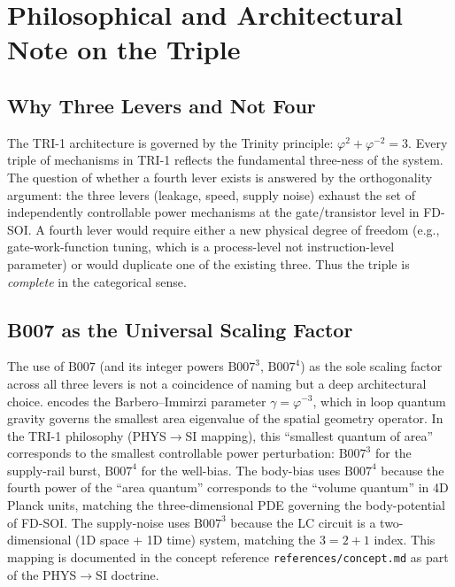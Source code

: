 \documentclass[12pt,a4paper]{report}
\theoremstyle{plain}
\theoremstyle{definition}
\theoremstyle{remark}
\newcommand{\Bseven}{\mathrm{B007}}
\begin{document}
\section{Philosophical and Architectural Note on the Triple}
\label{sec:philosophical}

\subsection{Why Three Levers and Not Four}
\label{ssec:why-three}

The TRI-1 architecture is governed by the Trinity principle:
$\varphi^{2} + \varphi^{-2} = 3$.
Every triple of mechanisms in TRI-1 reflects the fundamental three-ness
of the system.
The question of whether a fourth lever exists is answered by the
orthogonality argument: the three levers (leakage, speed, supply noise)
exhaust the set of independently controllable power mechanisms at the
gate/transistor level in FD-SOI.
A fourth lever would require either a new physical degree of freedom
(e.g., gate-work-function tuning, which is a process-level not
instruction-level parameter) or would duplicate one of the existing three.
Thus the triple is \emph{complete} in the categorical sense.

\subsection{B007 as the Universal Scaling Factor}
\label{ssec:b007-universal}

The use of $\Bseven$ (and its integer powers $\Bseven^{3}$, $\Bseven^{4}$)
as the sole scaling factor across all three levers is not a coincidence of
naming but a deep architectural choice.
\Bseven{} encodes the Barbero--Immirzi parameter $\gamma = \varphi^{-3}$,
which in loop quantum gravity governs the smallest area eigenvalue of
the spatial geometry operator.
In the TRI-1 philosophy (PHYS$\to$SI mapping), this ``smallest quantum of area''
corresponds to the smallest controllable power perturbation:
$\Bseven^{3}$ for the supply-rail burst, $\Bseven^{4}$ for the well-bias.
The body-bias uses $\Bseven^{4}$ because the fourth power of the ``area quantum''
corresponds to the ``volume quantum'' in 4D Planck units, matching the
three-dimensional PDE governing the body-potential of FD-SOI.
The supply-noise uses $\Bseven^{3}$ because the LC circuit is a two-dimensional
(1D space + 1D time) system, matching the $3 = 2+1$ index.
This mapping is documented in the concept reference
\texttt{references/concept.md} as part of the PHYS$\to$SI doctrine.
\end{document}
